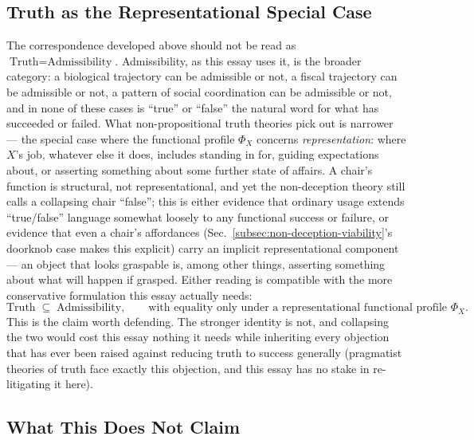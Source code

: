 \documentclass[11pt,a4paper]{article}
\theoremstyle{plain}
\theoremstyle{definition}
\theoremstyle{remark}
\begin{document}
\subsection{Truth as the Representational Special Case}
\label{subsec:truth-as-special-case}

The correspondence developed above should not be read as $\text{Truth} = \text{Admissibility}$. Admissibility, as this essay uses it, is the broader category: a biological trajectory can be admissible or not, a fiscal trajectory can be admissible or not, a pattern of social coordination can be admissible or not, and in none of these cases is ``true'' or ``false'' the natural word for what has succeeded or failed. What non-propositional truth theories pick out is narrower — the special case where the functional profile $\Phi_X$ concerns \emph{representation}: where $X$'s job, whatever else it does, includes standing in for, guiding expectations about, or asserting something about some further state of affairs. A chair's function is structural, not representational, and yet the non-deception theory still calls a collapsing chair ``false''; this is either evidence that ordinary usage extends ``true/false'' language somewhat loosely to any functional success or failure, or evidence that even a chair's affordances (Sec.~\ref{subsec:non-deception-viability}'s doorknob case makes this explicit) carry an implicit representational component — an object that looks graspable is, among other things, asserting something about what will happen if grasped. Either reading is compatible with the more conservative formulation this essay actually needs:
\[
\text{Truth} \;\subseteq\; \text{Admissibility}, \qquad \text{with equality only under a representational functional profile } \Phi_X.
\]
This is the claim worth defending. The stronger identity is not, and collapsing the two would cost this essay nothing it needs while inheriting every objection that has ever been raised against reducing truth to success generally (pragmatist theories of truth face exactly this objection, and this essay has no stake in re-litigating it here).

\subsection{What This Does Not Claim}
\label{subsec:truth-caveat}
\end{document}
